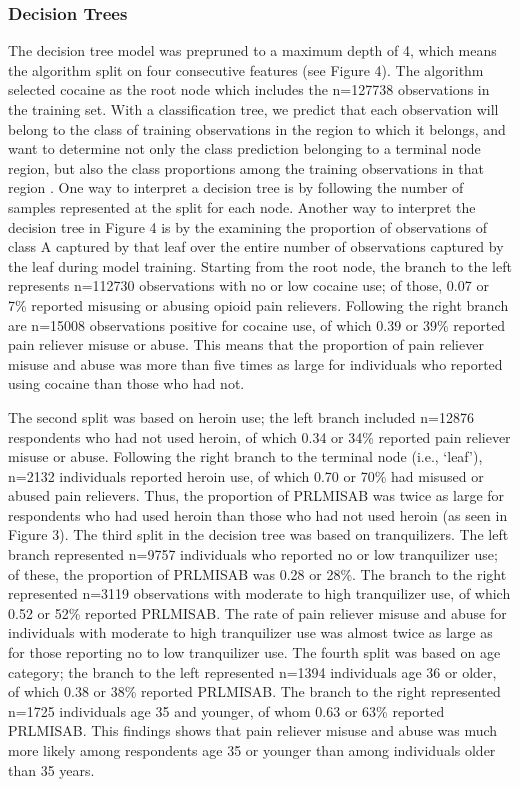 \documentclass[sigconf]{acmart}
\begin{document}
\subsubsection{Decision Trees} 

The decision tree model was prepruned to a maximum depth of 4, which means 
the algorithm split on four consecutive features (see Figure 4). The  
algorithm selected cocaine as the root node which includes the n=127738 
observations in the training set. With a classification tree, we predict 
that each observation will belong to the class of training observations in 
the region to which it belongs, and want to determine not only the class
prediction belonging to a terminal node region, but also the class 
proportions among the training observations in that region \cite{james13}. 
One way to interpret a decision tree is by following the number of samples 
represented at the split for each node. Another way to interpret the decision 
tree in Figure 4 is by the examining the proportion of observations of 
class A captured by that leaf over the entire number of observations captured 
by the leaf during model training. Starting from the root node, the branch 
to the left represents n=112730 observations with no or low cocaine use; 
of those, 0.07 or 7\% reported misusing or abusing opioid pain relievers. 
Following the right branch are n=15008 observations positive for cocaine use, 
of which 0.39 or 39\% reported pain reliever misuse or abuse. This means that 
the proportion of pain reliever misuse and abuse was more than five times as 
large for individuals who reported using cocaine than those who had not. 


The second split was based on heroin use; the left branch included n=12876 
respondents who had not used heroin, of which 0.34 or 34\% reported pain
reliever misuse or abuse. Following the right branch to the terminal node 
(i.e., `leaf'), n=2132 individuals reported heroin use, of which 0.70 or 
70\% had misused or abused pain relievers. Thus, the proportion of PRLMISAB 
was twice as large for respondents who had used heroin than those who had 
not used heroin (as seen in Figure 3). The third split in the decision tree
was based on tranquilizers. The left branch represented n=9757 individuals 
who reported no or low tranquilizer use; of these, the proportion of 
PRLMISAB was 0.28 or 28\%. The branch to the right represented n=3119 
observations with moderate to high tranquilizer use, of which 0.52 or 52\% 
reported PRLMISAB. The rate of pain reliever misuse and abuse for individuals 
with moderate to high tranquilizer use was almost twice as large as for 
those reporting no to low tranquilizer use. The fourth split was based on age 
category; the branch to the left represented n=1394 individuals age 36 or older, 
of which 0.38 or 38\% reported PRLMISAB. The branch to the right represented 
n=1725 individuals age 35 and younger, of whom 0.63 or 63\% reported PRLMISAB. 
This findings shows that pain reliever misuse and abuse was much more likely
among respondents age 35 or younger than among individuals older than 35 years. 
\end{document}
